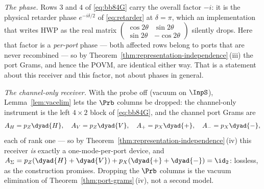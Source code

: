 \begin{example}
\emph{The phase.} Rows $3$ and $4$ of \eqref{eq:bb84G} carry the overall factor
$-i$: it is the physical retarder phase $e^{-i\delta/2}$ of
\eqref{eq:retarder} at $\delta=\pi$, which an implementation that writes
$\mathrm{HWP}$ as the real matrix
$\left(\begin{smallmatrix}\cos2\theta&\sin2\theta\\
\sin2\theta&-\cos2\theta\end{smallmatrix}\right)$ silently drops. Here that
factor is a \emph{per-port} phase --- both affected rows belong to ports that
are never recombined --- so by Theorem~\ref{thm:representation-independence}\,(iii) the port Grams, and
hence the POVM, are identical either way. That is a statement about this
receiver and this factor, not about phases in general.

\emph{The channel-only receiver.} With the probe off (vacuum on $\InpS$),
Lemma~\ref{lem:vacelim} lets the $\Prb$ columns be dropped: the channel-only
instrument is the left $4\times2$ block of \eqref{eq:bb84G}, and the
channel port Grams are
\begin{equation}\label{eq:bb84grams}
  A_H=p_Z\dyad{H},\quad A_V=p_Z\dyad{V},\quad
  A_+=p_X\dyad{+},\quad A_-=p_X\dyad{-},
\end{equation}
each of rank one --- so by Theorem~\ref{thm:representation-independence}\,(iv) this receiver \emph{is}
exactly a one-mode-per-port device, and
$A_\Sigma=p_Z(\dyad{H}+\dyad{V})+p_X(\dyad{+}+\dyad{-})=\id_2$: lossless, as
the construction promises. Dropping the $\Prb$ columns is the vacuum
elimination of Theorem~\ref{thm:port-grams}\,(iv), not a second model.
\end{example}

